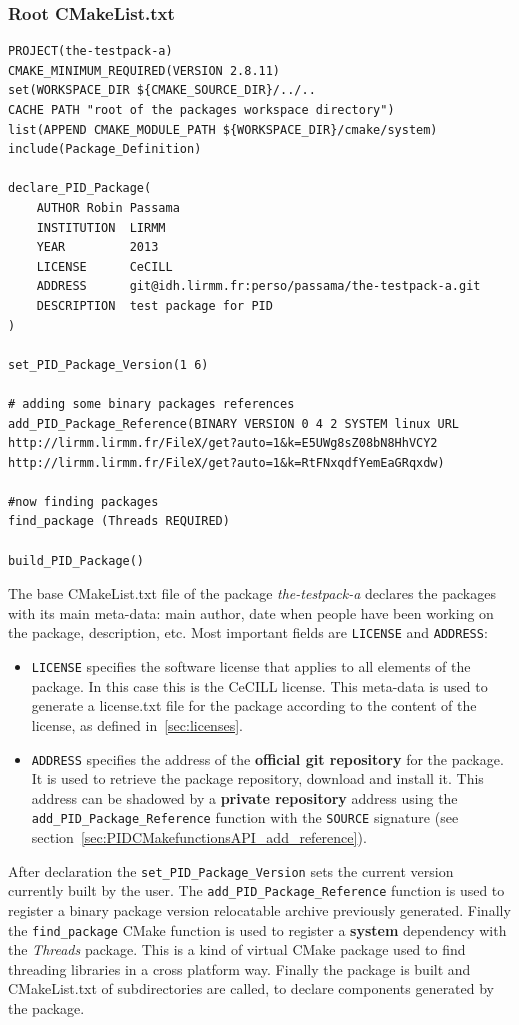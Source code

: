 \documentclass[12pt,a4paper]{article}
\begin{document}
\subsubsection{Root CMakeList.txt}

\begin{verbatim}
PROJECT(the-testpack-a)
CMAKE_MINIMUM_REQUIRED(VERSION 2.8.11)
set(WORKSPACE_DIR ${CMAKE_SOURCE_DIR}/../.. 
CACHE PATH "root of the packages workspace directory")
list(APPEND CMAKE_MODULE_PATH ${WORKSPACE_DIR}/cmake/system)
include(Package_Definition)

declare_PID_Package(	
    AUTHOR Robin Passama
    INSTITUTION  LIRMM 
    YEAR         2013 
    LICENSE      CeCILL
    ADDRESS      git@idh.lirmm.fr:perso/passama/the-testpack-a.git
    DESCRIPTION  test package for PID
)

set_PID_Package_Version(1 6)

# adding some binary packages references
add_PID_Package_Reference(BINARY VERSION 0 4 2 SYSTEM linux URL
http://lirmm.lirmm.fr/FileX/get?auto=1&k=E5UWg8sZ08bN8HhVCY2
http://lirmm.lirmm.fr/FileX/get?auto=1&k=RtFNxqdfYemEaGRqxdw)

#now finding packages
find_package (Threads REQUIRED)

build_PID_Package()
\end{verbatim}

The base CMakeList.txt file of the package \textit{the-testpack-a} declares the packages with its main meta-data: main author, date when people have been working on the package, description, etc. Most important fields are \texttt{LICENSE} and \texttt{ADDRESS}:
\begin{itemize}
\item \texttt{LICENSE} specifies the software license that applies to all elements of the package. In this case this is the CeCILL license. This meta-data is used to generate a license.txt file for the package according to the content of the license, as defined in~\ref{sec:licenses}.
\item \texttt{ADDRESS} specifies the address of the \textbf{official git repository} for the package. It is used to retrieve the package repository, download and install it. This address can be shadowed by a \textbf{private repository} address using the \texttt{add\_PID\_Package\_Reference} function with the \texttt{SOURCE} signature (see section~\ref{sec:PIDCMakefunctionsAPI_add_reference}).
\end{itemize}

After declaration the \texttt{set\_PID\_Package\_Version} sets the current version currently built by the user. The \texttt{add\_PID\_Package\_Reference} function is used to register a binary package version relocatable archive previously generated. Finally the \texttt{find\_package} CMake function is used to register a \textbf{system} dependency with the \textit{Threads} package. This is a kind of virtual CMake package used to find threading libraries in a cross platform way. Finally the package is built and CMakeList.txt of subdirectories are called, to declare components generated by the package.
\end{document}
